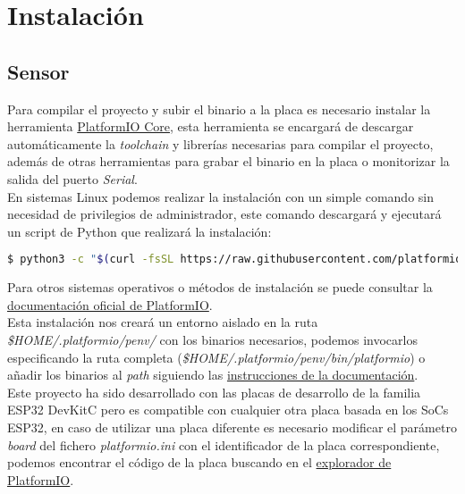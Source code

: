 \documentclass[../proyecto.tex]{subfiles}
\begin{document}
\chapter{Instalación}\label{chap:anexo_instalacion}

\section{Sensor}\label{sect:instalacion_sensor}
Para compilar el proyecto y subir el binario a la placa es necesario instalar la herramienta \href{https://docs.platformio.org/en/latest/core/}{PlatformIO Core}, esta herramienta se encargará de descargar automáticamente la \textit{toolchain} y librerías necesarias para compilar el proyecto, además de otras herramientas para grabar el binario en la placa o monitorizar la salida del puerto \textit{Serial}.\\

En sistemas Linux podemos realizar la instalación con un simple comando sin necesidad de privilegios de administrador, este comando descargará y ejecutará un script de Python que realizará la instalación:\\

\begin{minipage}{\linewidth}
\begin{lstlisting}[language=bash, caption=Comando para la instalación de PlatformIO Core, captionpos=b, frame=single]
$ python3 -c "$(curl -fsSL https://raw.githubusercontent.com/platformio/platformio/develop/scripts/get-platformio.py)"
\end{lstlisting}
\end{minipage}

Para otros sistemas operativos o métodos de instalación se puede consultar la \href{https://docs.platformio.org/en/latest/core/installation.html\#local-download-mac-linux-windows}{documentación oficial de PlatformIO}.\\

Esta instalación nos creará un entorno aislado en la ruta \textit{\$HOME/.platformio/penv/} con los binarios necesarios, podemos invocarlos especificando la ruta completa (\textit{\$HOME/.platformio/penv/bin/platformio}) o añadir los binarios al \textit{path} siguiendo las \href{https://docs.platformio.org/en/latest/core/installation.html\#unix-and-unix-like}{instrucciones de la documentación}. \\

Este proyecto ha sido desarrollado con las placas de desarrollo de la familia ESP32 DevKitC pero es compatible con cualquier otra placa basada en los SoCs ESP32, en caso de utilizar una placa diferente es necesario modificar el parámetro \textit{board} del fichero \textit{platformio.ini} con el identificador de la placa correspondiente, podemos encontrar el código de la placa buscando en el \href{https://platformio.org/boards}{explorador de PlatformIO}.\\
\end{document}
